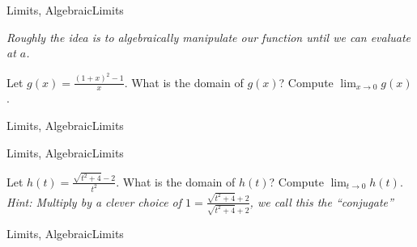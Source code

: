 

\begin{tagblock}{Limits, AlgebraicLimits}
\begin{question}
	\emph{Roughly the idea is to algebraically manipulate our function until we can evaluate at $a$.  }
 
 
 
 
  Let $\displaystyle g(x) =  \frac{(1+x)^2 - 1}{x}$.  What is the domain of $g(x)$?   Compute $\displaystyle \lim_{x \to 0} g(x)$. \\

	
	
\begin{tags}
	    Limits, AlgebraicLimits
\end{tags}
	
\begin{diary}
	    
\end{diary}
	
\begin{solution}
	  
\end{solution}
	
\end{question}

\end{tagblock}




\begin{tagblock}{Limits, AlgebraicLimits}
\begin{question}
	 Let $\displaystyle h(t)= \frac{\sqrt{t^2+4}-2}{t^2}$.   What is the domain of $h(t)$?  Compute $\displaystyle  \lim_{t \to 0} h(t)$.\\
 \emph{Hint: Multiply by a clever choice of $\displaystyle 1 = \frac{\sqrt{t^2+4}+2}{\sqrt{t^2+4}+2}$, we call this the ``conjugate'' }
	
	
\begin{tags}
	    Limits, AlgebraicLimits
\end{tags}
	
\begin{diary}
	    
\end{diary}
	
\begin{solution}
	  
\end{solution}
	
\end{question}

\end{tagblock}

